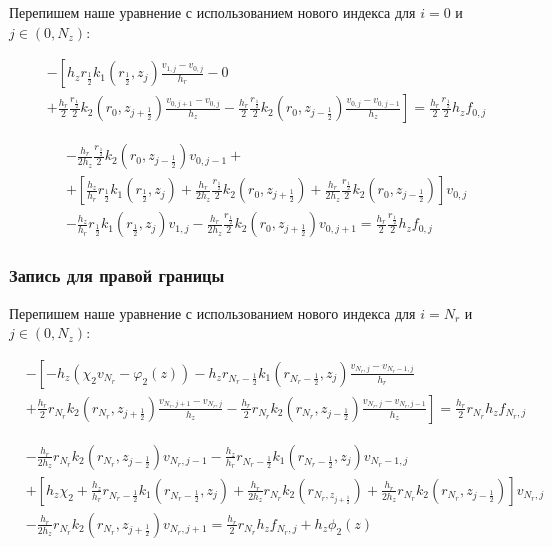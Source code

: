 Перепишем наше уравнение с использованием нового индекса для $i = 0$ и $ j \in (0, N_z) $:

\begin{align*}
  &- \left [ 
    h_z r_{\frac{1}{2}} k_1(r_{\frac{1}{2}}, z_j) \frac{v_{1, j} - v_{0, j}}{h_{r}}
    - 0
    \right . \\
    &\left .
    + \frac{h_r}{2} \frac{r_{\frac{1}{2}}}{2} k_2(r_0, z_{j+\frac{1}{2}}) \frac{v_{0, j + 1} - v_{0, j}}{h_{z}}
    - \frac{h_r}{2} \frac{r_{\frac{1}{2}}}{2} k_2(r_0, z_{j-\frac{1}{2}}) \frac{v_{0, j} - v_{0, j - 1}}{h_z}
    \right ]  = \frac{h_r}{2} \frac{r_{\frac{1}{2}}}{2} h_z f_{0, j}
\end{align*}

\begin{align*}
  & - \frac{h_r}{2 h_z} \frac{r_{\frac{1}{2}}}{2} k_2(r_0, z_{j - \frac{1}{2}}) v_{0, j - 1} + \\
  & + \left[
    \frac{h_z}{h_r} r_{\frac{1}{2}} k_1(r_{\frac{1}{2}}, z_j) + \frac{h_r}{2 h_z} \frac{r_{\frac{1}{2}}}{2} k_2(r_0, z_{j+\frac{1}{2}})
    + \frac{h_r}{2 h_z} \frac{r_{\frac{1}{2}}}{2} k_2(r_0, z_{j -\frac{1}{2}})
  \right] v_{0, j} \\
  & - \frac{h_z}{h_r} r_{\frac{1}{2}} k_1(r_{\frac{1}{2}}, z_j) v_{1, j}
  - \frac{h_r}{2 h_z} \frac{r_{\frac{1}{2}}}{2} k_2(r_0, z_{j + \frac{1}{2}}) v_{0, j + 1} = \frac{h_r}{2} \frac{r_{\frac{1}{2}}}{2} h_z f_{0, j}
\end{align*}

\subsubsection{Запись для правой границы}
Перепишем наше уравнение с использованием нового индекса для $i = N_r$ и $ j \in (0, N_z) $:

\begin{align*}
  &- \left [ 
  -h_z ( \chi_2 v_{N_r} - \varphi_2(z))
  - h_z r_{N_r-\frac{1}{2}} k_1(r_{N_r-\frac{1}{2}}, z_j) \frac{v_{N_r, j} - v_{N_r - 1, j}}{h_{r}}
  \right . \\
  &\left .
  + \frac{h_r}{2} r_{N_r} k_2(r_{N_r}, z_{j+\frac{1}{2}}) \frac{v_{N_r, j + 1} - v_{N_r, j}}{h_{z}}
  - \frac{h_r}{2} r_{N_r} k_2(r_{N_r}, z_{j-\frac{1}{2}}) \frac{v_{N_r, j} - v_{N_r, j - 1}}{h_z}
  \right ]  = \frac{h_r}{2} r_{N_r} h_z f_{N_r, j}
\end{align*}

\begin{align*}
  & - \frac{h_r}{2h_z} r_{N_r} k_2(r_{N_r}, z_{j - \frac{1}{2}}) v_{N_r, j - 1}
  - \frac{h_z}{h_r} r_{N_r - \frac{1}{2}} k_1(r_{N_r - \frac{1}{2}}, z_j) v_{N_r - 1, j} \\
  & +\left[
    h_z\chi_2  + \frac{h_z}{h_r} r_{N_r - \frac{1}{2}} k_1(r_{N_r -\frac{1}{2}}, z_j)
    + \frac{h_r}{2 h_z} r_{N_r} k_2(r_{N_r, z_{j + \frac{1}{2}}})
    + \frac{h_r}{2 h_z} r_{N_r} k_2 (r_{N_r}, z_{j - \frac{1}{2}})
  \right] v_{N_r, j} \\
  &- \frac{h_r}{2 h_z} r_{N_r} k_2(r_{N_r}, z_{j + \frac{1}{2}}) v_{N_r, j + 1}
  = \frac{h_r}{2} r_{N_r} h_z f_{N_r, j} + h_z\phi_2(z)
\end{align*}

